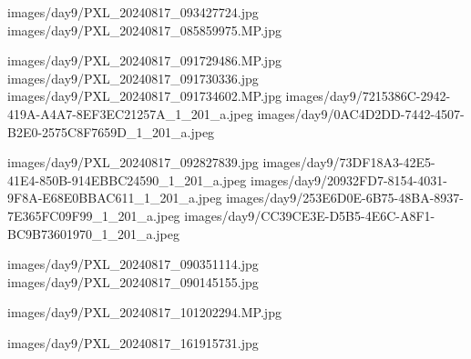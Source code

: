 %

%

                      {images/day9/PXL_20240817_093427724.jpg}
                      {images/day9/PXL_20240817_085859975.MP.jpg}

                   {images/day9/PXL_20240817_091729486.MP.jpg}
                   {images/day9/PXL_20240817_091730336.jpg}
                   {images/day9/PXL_20240817_091734602.MP.jpg}
                   {images/day9/7215386C-2942-419A-A4A7-8EF3EC21257A_1_201_a.jpeg}
                   {images/day9/0AC4D2DD-7442-4507-B2E0-2575C8F7659D_1_201_a.jpeg}

                   {images/day9/PXL_20240817_092827839.jpg}
                   {images/day9/73DF18A3-42E5-41E4-850B-914EBBC24590_1_201_a.jpeg}
                   {images/day9/20932FD7-8154-4031-9F8A-E68E0BBAC611_1_201_a.jpeg}
                   {images/day9/253E6D0E-6B75-48BA-8937-7E365FC09F99_1_201_a.jpeg}
                   {images/day9/CC39CE3E-D5B5-4E6C-A8F1-BC9B73601970_1_201_a.jpeg}

                      {images/day9/PXL_20240817_090351114.jpg}
                      {images/day9/PXL_20240817_090145155.jpg} 

                      {images/day9/PXL_20240817_101202294.MP.jpg}
%

                      {images/day9/PXL_20240817_161915731.jpg}

\pagestyle{fancy} %